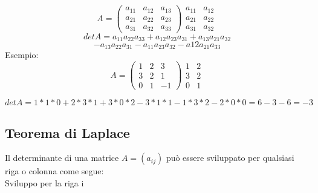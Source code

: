\documentclass[12pt]{article}
\begin{document}
\[A = \begin{pmatrix}
    a_{11} & a_{12} & a_{13}\\
    a_{21} & a_{22} & a_{23}\\
    a_{31} & a_{32} & a_{33}
\end{pmatrix}
\begin{matrix}
    a_{11} & a_{12} \\
    a_{21} & a_{22} \\
    a_{31} & a_{32}
\end{matrix}
\]
\[det A = a_{11}a_{22}a_{33} + a_{12}a_{23}a_{31} + a_{13}a_{21}a_{32} \]
\[- a_{13}a_{22}a_{31} - a_{11}a_{23}a_{32}-a{12}a_{21}a_{33}\]
Esempio:
\[A = \begin{pmatrix}
    1 & 2 & 3\\
    3 & 2 & 1\\
    0 & 1 & -1
\end{pmatrix}
\begin{matrix}
    1 & 2\\
    3 & 2\\
    0 & 1
\end{matrix}
\]


\[det A = 1*1*0 + 2*3*1 + 3*0*2 - 3*1*1 - 1*3*2 - 2*0*0 = 6 - 3 - 6 = -3\]

\subsection{Teorema di Laplace}

Il determinante di una matrice $A = (a_{ij})$ può essere sviluppato per qualsiasi riga o colonna come segue:\\
Sviluppo per la riga i
\end{document}
